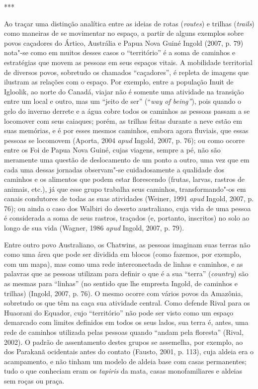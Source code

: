\begin{center}
***
\end{center}

Ao traçar uma distinção analítica entre as ideias de rotas
(\emph{routes}) e trilhas (\emph{trails}) como maneiras de se movimentar
no espaço, a partir de alguns exemplos sobre povos caçadores do Ártico,
Austrália e Papua Nova Guiné Ingold (2007, p. 79) nota"-se como em muitos
desses casos o ``território'' é a soma de caminhos e estratégias que
movem as pessoas em seus espaços vitais. A mobilidade territorial de
diversos povos, sobretudo os chamados ``caçadores'', é repleta de
imagens que ilustram as relações com o espaço. Por exemplo, entre a
população Inuit de Igloolik, ao norte do Canadá, viajar não é somente
uma atividade na transição entre um local e outro, mas um ``jeito de
ser'' (``\emph{way of being''}), pois quando o gelo do inverno derrete e
a água cobre todos os caminhos as pessoas passam a se locomover com seus
caiaques; porém, as trilhas feitas durante a neve estão em suas
memórias, e é por esses mesmos caminhos, embora agora fluviais, que
essas pessoas se locomovem (Aporta, 2004 \emph{apud} Ingold, 2007, p. 76); ou
como ocorre entre os Foi de Papua Nova Guiné, cujas viagens, sempre a
pé, não são meramente uma questão de deslocamento de um ponto a outro,
uma vez que em cada uma dessas jornadas observam"-se cuidadosamente a
qualidade dos caminhos e os alimentos que podem estar florescendo
(frutas, larvas, rastros de animais, etc.), já que esse grupo trabalha
seus caminhos, transformando"-os em canais condutores de todas as suas
atividades (Weiner, 1991 \emph{apud} Ingold, 2007, p. 76); ou ainda o caso dos
Walbiri do deserto australiano, cuja vida de uma pessoa é considerada a
soma de seus rastros, traçados (e, portanto, inscritos) no solo ao longo
de sua vida (Wagner, 1986 \emph{apud} Ingold, 2007, p. 79).

Entre outro povo Australiano, os Chatwins, as pessoas imaginam suas
terras não como uma área que pode ser dividida em blocos (como fazemos,
por exemplo, com um mapa), mas como uma rede interconectada de linhas e
caminhos, e as palavras que as pessoas utilizam para definir o que é a
sua ``terra'' (\emph{country}) são as mesmas para ``linhas'' (no sentido
que lhe empresta Ingold, de caminhos e trilhas) (Ingold, 2007, p. 76). O
mesmo ocorre com vários povos da Amazônia, sobretudo os que têm na caça
sua atividade central. Como defende Rival para os Huaorani do Equador,
cujo ``território'' não pode ser visto como um espaço demarcado com
limites definidos em todos os seus lados, sua terra é, antes, uma rede
de caminhos utilizada pelas pessoas quando ``andam pela floresta''
(Rival, 2002). O padrão de assentamento destes grupos se assemelha, por
exemplo, ao dos Parakanã ocidentais antes do contato (Fausto, 2001, p.
113), cuja aldeia era o acampamento, e não tinham um modelo de aldeia
base com casas permanentes; tudo o que conheciam eram os \emph{tapiris}
da mata, casas monofamiliares e aldeias sem roças ou praça.

